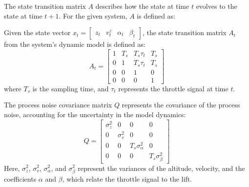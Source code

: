 \documentclass{article}
\begin{document}



The state transition matrix \( A \) describes how the state at time \( t \) evolves to the state at time \( t+1 \). For the given system, \( A \) is defined as:

Given the state vector \( x_t = \begin{bmatrix} z_t&  v_t^z&  \alpha_t&  \beta_t \end{bmatrix} \), the state transition matrix \( A_t \) from the system's dynamic model is defined as:
\begin{equation}
A_t = 
\begin{bmatrix}
1 & T_s & T_s \tau_t & T_s \\
0 & 1 & T_s \tau_t & T_s \\
0 & 0 & 1 & 0 \\
0 & 0 & 0 & 1
\end{bmatrix}
\end{equation}
where \( T_s \) is the sampling time, and \( \tau_t \) represents the throttle signal at time \( t \).

The process noise covariance matrix \( Q \) represents the covariance of the process noise, accounting for the uncertainty in the model dynamics:
\begin{equation}
Q = 
\begin{bmatrix}
\sigma_z^2 & 0 & 0 & 0 \\
0 & \sigma_v^2 & 0 & 0 \\
0 & 0 & T_s \sigma_\alpha^2 & 0 \\
0 & 0 & 0 & T_s \sigma_\beta^2
\end{bmatrix}
\end{equation}
Here, \( \sigma_z^2 \), \( \sigma_v^2 \), \( \sigma_\alpha^2 \), and \( \sigma_\beta^2 \) represent the variances of the altitude, velocity, and the coefficients \( \alpha \) and \( \beta \), which relate the throttle signal to the lift.
\end{document}
